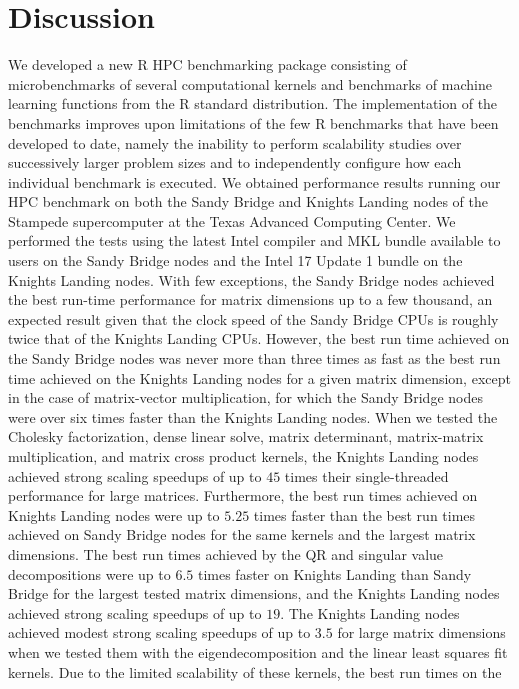 \section{Discussion}
We developed a new R HPC benchmarking package consisting of microbenchmarks of
  several computational kernels and benchmarks of machine learning functions
  from the R standard distribution.
The implementation of the benchmarks improves upon limitations of the few R
  benchmarks that have been developed to date, namely the inability to perform
  scalability studies over successively larger problem sizes and to
  independently configure how each individual benchmark is executed.   
We obtained performance results running our HPC benchmark on both the Sandy
  Bridge and Knights Landing nodes of the Stampede supercomputer at the Texas
  Advanced Computing Center.
We performed the tests using the latest Intel compiler and MKL bundle available
  to users on the Sandy Bridge nodes and the Intel 17 Update 1 bundle on the
  Knights Landing nodes.
With few exceptions, the Sandy Bridge nodes achieved the best run-time
  performance for matrix dimensions up to a few thousand, an expected result
  given that the clock speed of the Sandy Bridge CPUs is roughly twice that of
  the Knights Landing CPUs.
However, the best run time achieved on the Sandy Bridge nodes was never more
  than three times as fast as the best run time achieved on the Knights Landing
  nodes for a given matrix dimension, except in the case of matrix-vector
  multiplication, for which the Sandy Bridge nodes were over six times faster
  than the Knights Landing nodes.
When we tested the Cholesky factorization, dense linear solve, matrix
  determinant, matrix-matrix multiplication, and matrix cross product kernels,
  the Knights Landing nodes achieved strong scaling speedups of up to $45$ times
  their single-threaded performance for large matrices.
Furthermore, the best run times achieved on Knights Landing nodes were up to
  $5.25$ times faster than the best run times achieved on Sandy Bridge nodes for
  the same kernels and the largest matrix dimensions.
The best run times achieved by the QR and singular value decompositions were up
  to $6.5$ times faster on Knights Landing than Sandy Bridge for the largest
  tested matrix dimensions, and the Knights Landing nodes achieved strong
  scaling speedups of up to $19$.
The Knights Landing nodes achieved modest strong scaling speedups of up to $3.5$
  for large matrix dimensions when we tested them with the eigendecomposition
  and the linear least squares fit kernels.
Due to the limited scalability of these kernels, the best run times on the
